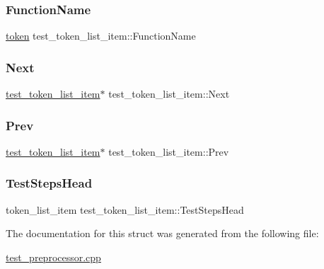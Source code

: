 \subsubsection{\texorpdfstring{Function\+Name}{FunctionName}}
{\footnotesize\ttfamily \hyperlink{structtoken}{token} test\+\_\+token\+\_\+list\+\_\+item\+::\+Function\+Name}

\mbox{\label{structtest__token__list__item_a271ea32ddd03b4f6bb44237881915692}} 
\subsubsection{\texorpdfstring{Next}{Next}}
{\footnotesize\ttfamily \hyperlink{structtest__token__list__item}{test\+\_\+token\+\_\+list\+\_\+item}$\ast$ test\+\_\+token\+\_\+list\+\_\+item\+::\+Next}

\mbox{\label{structtest__token__list__item_aa053b5098e750d72759f6520d287c74d}} 
\subsubsection{\texorpdfstring{Prev}{Prev}}
{\footnotesize\ttfamily \hyperlink{structtest__token__list__item}{test\+\_\+token\+\_\+list\+\_\+item}$\ast$ test\+\_\+token\+\_\+list\+\_\+item\+::\+Prev}

\mbox{\label{structtest__token__list__item_a30e55573c651ec80614b75f9b180dc80}} 
\subsubsection{\texorpdfstring{Test\+Steps\+Head}{TestStepsHead}}
{\footnotesize\ttfamily token\+\_\+list\+\_\+item test\+\_\+token\+\_\+list\+\_\+item\+::\+Test\+Steps\+Head}



The documentation for this struct was generated from the following file\+:\begin{DoxyCompactItemize}
\item 
\hyperlink{test__preprocessor_8cpp}{test\+\_\+preprocessor.\+cpp}\end{DoxyCompactItemize}

